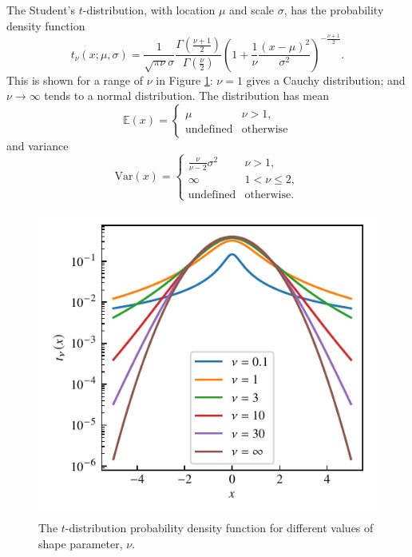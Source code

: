 \documentclass[fleqn,usenatbib]{rasti}
\begin{document}
The Student's $t$-distribution, with location $\mu$ and scale $\sigma$, has
the probability density function
\begin{equation}
    t_{\nu} \left(x; {\mu}, {\sigma}\right)
        =
    \frac{1}{\sqrt{\pi \nu} \sigma}
    \frac{
        \Gamma \left(\frac{\nu + 1}2\right)
    }{
        \Gamma \left(\frac{\nu}2\right)
    }
    \left(
        1 + \frac{1}{\nu} \frac{\left(x - \mu\right)^2}{\sigma^2}
    \right)^{
        -\frac{\nu + 1}{2}
    }.
\end{equation}
This is shown for a range of $\nu$ in Figure \ref{fig:model.t}: $\nu
= 1$ gives a Cauchy distribution; and $\nu \rightarrow \infty$ tends to a normal
distribution. The distribution has mean
\begin{equation}
    \mathbb{E}(x)
        =
    \begin{cases}
        \mu & \nu > 1, \\
        \textrm{undefined} & \textrm{otherwise}
    \end{cases}
\end{equation}
and variance
\begin{equation}
    \mathrm{Var}(x)
        =
    \begin{cases}
        \frac{\nu}{\nu - 2} \sigma^2 & \nu > 1, \\
        \infty & 1 < \nu \leq 2, \\
        \textrm{undefined} & \textrm{otherwise.}
    \end{cases}
\end{equation}

\begin{figure}
	\includegraphics{graphics/t-dist-log.pdf}
    \caption{The $t$-distribution probability density function for different
    values of shape parameter, $\nu$.}
    \label{fig:model.t}
\end{figure}
\end{document}
